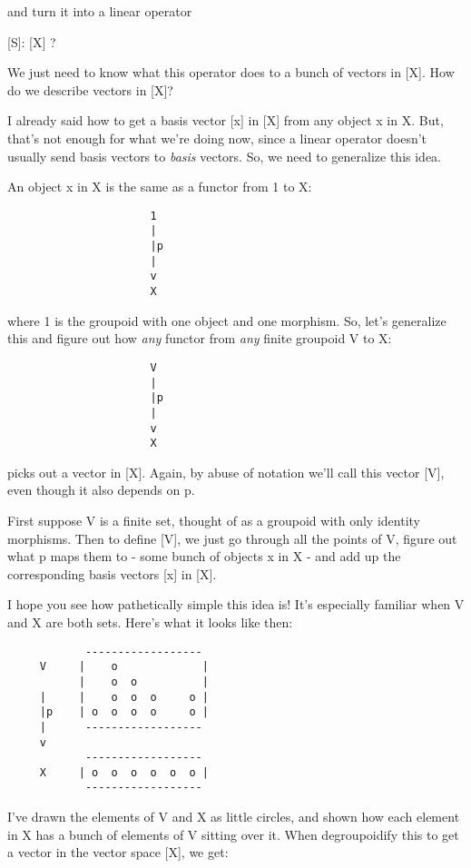 and turn it into a linear operator 

[S]: [X] \to  [Y] ?

We just need to know what this operator does to a bunch of
vectors in [X].  How do we describe vectors in [X]?  

I already said how to get a basis vector [x] in [X] from any object
x in X.  But, that's not enough for what we're doing now, since a 
linear operator doesn't usually send basis vectors to \emph{basis}
vectors.  So, we need to generalize this idea.

An object x in X is the same as a functor from 1 to X:

\begin{verbatim}
                      1
                      |
                      |p
                      |
                      v
                      X
\end{verbatim}
    
where 1 is the groupoid with one object and one morphism.  So, 
let's generalize this and figure out how \emph{any} functor from 
\emph{any} finite groupoid V to X:

\begin{verbatim}
                      V
                      |
                      |p
                      |
                      v
                      X
\end{verbatim}
    
picks out a vector in [X].  Again, by abuse of notation we'll
call this vector [V], even though it also depends on p.

First suppose V is a finite set, thought of as a groupoid with
only identity morphisms.  Then to define [V], we just go through 
all the points of V, figure out what p maps them to - some bunch 
of objects x in X - and add up the corresponding basis vectors 
[x] in [X].

I hope you see how pathetically simple this idea is!  It's especially
familiar when V and X are both sets.  Here's what it looks like then:

\begin{verbatim}
            ------------------
     V     |    o             |
           |    o  o          |
     |     |    o  o  o     o |   
     |p    | o  o  o  o     o |
     |      ------------------
     v
            ------------------
     X     | o  o  o  o  o  o |
            ------------------
\end{verbatim}
    
I've drawn the elements of V and X as little circles, and shown how 
each element in X has a bunch of elements of V sitting over it.  When 
degroupoidify this to get a vector in the vector space [X], we get:

